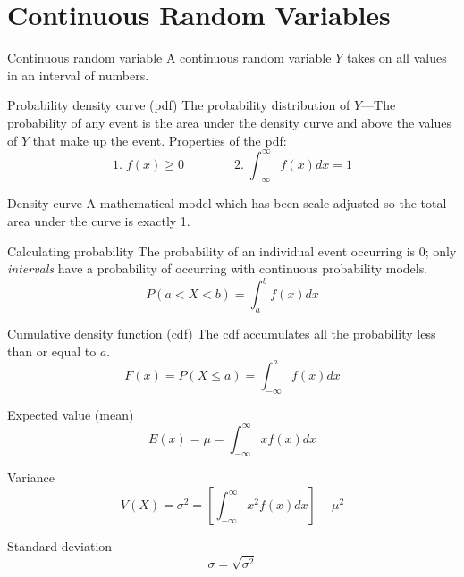 \documentclass[]{article}
\newenvironment{definitions}{
	\begin{description}[font=\sffamily\bfseries, leftmargin=1cm, style=nextline]
	}{
	\end{description}
}
\begin{document}
\section{Continuous Random Variables}
\begin{definitions}
	\item[Continuous random variable]
	A continuous random variable $Y$ takes on all values in an interval of numbers.
	\item[Probability density curve (pdf)]
	The probability distribution of $Y$---The probability of any event is the area under the density curve and above the values of $Y$ that make up the event.
	Properties of the pdf:
	\[
	1.\; f(x) \geq 0 \qquad \qquad 2.\; \int_{-\infty}^{\infty}f(x)dx = 1
	\]
	\item[Density curve]
	A mathematical model which has been scale-adjusted so the total area under the curve is exactly 1.
	\item[Calculating probability]
	The probability of an individual event occurring is 0; only \emph{intervals} have a probability of occurring with continuous probability models.
	\[ P(a < X < b) = \int_{a}^{b}f(x)dx \]
	\item[Cumulative density function (cdf)]
	The cdf accumulates all the probability less than or equal to $a$.
	\[ F(x) = P(X \leq a) = \int_{-\infty}^af(x)dx \]
	\item[Expected value (mean)]
	\[ E(x) = \mu = \int_{-\infty}^{\infty}xf(x)dx \]
	\item[Variance]
	\[ V(X) = \sigma^2 = \left[\int_{-\infty}^{\infty}x^2f(x)dx\right] - \mu^2 \]
	\item[Standard deviation]
	\[ \sigma = \sqrt{\sigma^2} \]
\end{definitions}
\end{document}
